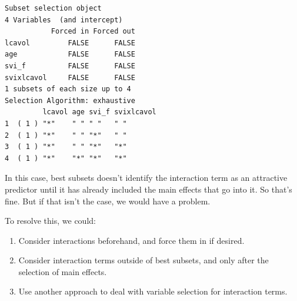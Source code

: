 \documentclass[]{book}
\providecommand{\tightlist}{%
  \setlength{\itemsep}{0pt}\setlength{\parskip}{0pt}}
\theoremstyle{definition}
\theoremstyle{definition}
\theoremstyle{definition}
\theoremstyle{remark}
\begin{document}
\begin{verbatim}
Subset selection object
4 Variables  (and intercept)
           Forced in Forced out
lcavol         FALSE      FALSE
age            FALSE      FALSE
svi_f          FALSE      FALSE
svixlcavol     FALSE      FALSE
1 subsets of each size up to 4
Selection Algorithm: exhaustive
         lcavol age svi_f svixlcavol
1  ( 1 ) "*"    " " " "   " "       
2  ( 1 ) "*"    " " "*"   " "       
3  ( 1 ) "*"    " " "*"   "*"       
4  ( 1 ) "*"    "*" "*"   "*"       
\end{verbatim}

In this case, best subsets doesn't identify the interaction term as an
attractive predictor until it has already included the main effects that
go into it. So that's fine. But if that isn't the case, we would have a
problem.

To resolve this, we could:

\begin{enumerate}
\def\labelenumi{\arabic{enumi}.}
\tightlist
\item
  Consider interactions beforehand, and force them in if desired.
\item
  Consider interaction terms outside of best subsets, and only after the
  selection of main effects.
\item
  Use another approach to deal with variable selection for interaction
  terms.
\end{enumerate}


\end{document}
